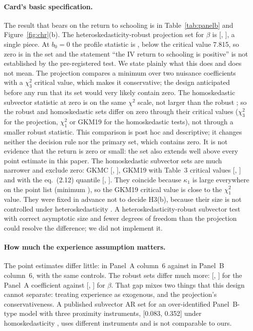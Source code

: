 \documentclass[11pt]{article}
\begin{document}
\paragraph{Card's basic specification.} The result that bears on the return to schooling
is in Table~\ref{tab:panelb} and Figure~\ref{fig:chr}(b). The heteroskedasticity-robust
projection set for $\beta$ is [\BSixArRobLo, \BSixArRobHi], a single piece. At $b_0 = 0$
the profile statistic is \BSixRobMAtZero{}, below the critical value 7.815, so zero is in
the set and the statement ``the IV return to schooling is positive'' is not established by
the pre-registered test. We state plainly what this does and does not mean. The projection
compares a minimum over two nuisance coefficients with a $\chi^2_3$ critical value, which
makes it conservative; the design anticipated before any run that its set would very
likely contain zero. The homoskedastic subvector statistic at zero is \BSixHomStatAtZero{}
on the same $\chi^2$ scale, not larger than the robust \BSixRobMAtZero{}; so the robust and
homoskedastic sets differ on zero through their critical values ($\chi^2_3$ for the
projection, $\chi^2_1$ or GKM19 for the homoskedastic tests), not through a smaller robust
statistic. This comparison is post hoc and descriptive; it changes neither the decision
rule nor the primary set, which contains zero. It is not evidence that the return is zero or small: the set also extends
well above every point estimate in this paper. The homoskedastic subvector sets are much
narrower and exclude zero: GKMC [\BSixArGkmcLo, \BSixArGkmcHi], GKM19 with Table~3 critical
values [\BSixArGkmOneNineLo, \BSixArGkmOneNineHi] and with the eq.~(2.12) quantile
[\BSixArGkmOneNineqLo, \BSixArGkmOneNineqHi]. They coincide because $\kappa_1$ is large
everywhere on the point list (minimum \BSixKappaOneMin{}), so the GKM19 critical value is
close to the $\chi^2_1$ value. They were fixed in advance not to decide H3(b), because their
size is not controlled under heteroskedasticity
\citep{guggenberger2019more}. A heteroskedasticity-robust subvector test with correct asymptotic size and fewer degrees
of freedom than the projection \citep{guggenberger2024powerful} could resolve the
difference; we did not implement it.

\paragraph{How much the experience assumption matters.} The point estimates differ
little: \ASixIv{} in Panel~A column~6 against \IvReturn{} in Panel~B column~6, with the same
controls. The robust sets differ much more: [\ASixArLo, \ASixArHi] for the Panel~A
coefficient against [\BSixArRobLo, \BSixArRobHi] for $\beta$. That gap mixes two things that
this design cannot separate: treating experience as exogenous, and the projection's
conservativeness. A published subvector AR set for an over-identified Panel~B-type model
with three proximity instruments, [0.083, 0.352] under homoskedasticity %
\citep{londschien2025guide}, uses different instruments and is not comparable to ours.
\end{document}
